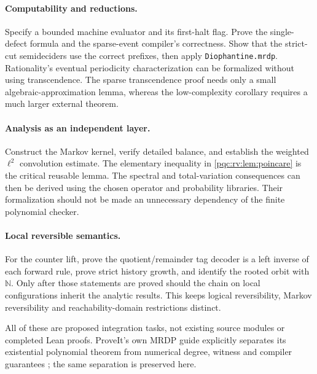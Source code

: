 \documentclass[11pt,letterpaper]{article}
\numberwithin{equation}{section}
\theoremstyle{definition}
\theoremstyle{remark}
\newcommand{\N}{\mathbb N}
\newcommand{\code}[1]{\nolinkurl{#1}}
\begin{document}
\paragraph{Computability and reductions.}
Specify a bounded machine evaluator and its first-halt flag.
Prove the single-defect formula and the sparse-event compiler's
correctness. Show that the strict-cut semideciders use the correct
prefixes, then apply \code{Diophantine.mrdp}. Rationality's eventual
periodicity characterization can be formalized without using
transcendence. The sparse transcendence proof needs only a small
algebraic-approximation lemma, whereas the low-complexity corollary
requires a much larger external theorem.

\paragraph{Analysis as an independent layer.}
Construct the Markov kernel, verify detailed balance, and establish
the weighted $\ell^2$ convolution estimate. The elementary inequality
in \cref{pqc:rv:lem:poincare} is the critical reusable lemma. The spectral
and total-variation consequences can then be derived using the chosen
operator and probability libraries. Their formalization should not
be made an unnecessary dependency of the finite polynomial checker.

\paragraph{Local reversible semantics.}
For the counter lift, prove the quotient/remainder tag decoder is a
left inverse of each forward rule, prove strict history growth, and
identify the rooted orbit with $\N$. Only after those statements are
proved should the chain on local configurations inherit the analytic
results. This keeps logical reversibility, Markov reversibility and
reachability-domain restrictions distinct.

All of these are proposed integration tasks, not existing source
modules or completed Lean proofs. ProveIt's own MRDP guide explicitly
separates its existential polynomial theorem from numerical degree,
witness and compiler guarantees \cite{b62s17-proveit-mrdp}; the same
separation is preserved here.

\end{document}
